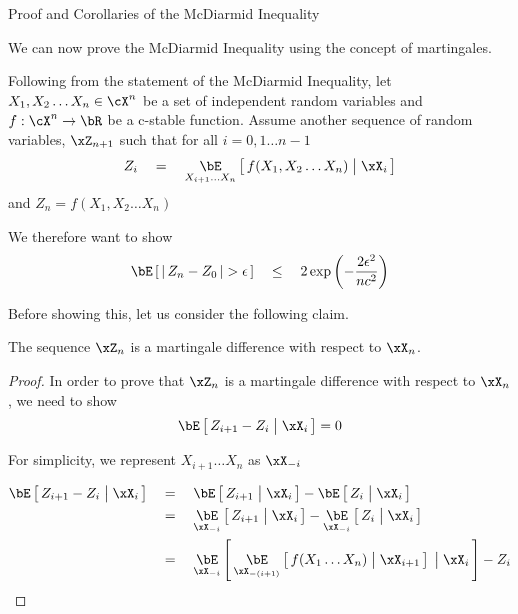 \documentclass{article}
\begin{document}
\begin{ssection}{Proof and Corollaries of the McDiarmid Inequality}
	
	We can now prove the McDiarmid Inequality using the concept of martingales. \br
	
	
	Following from the statement of the McDiarmid Inequality, let $X_1, X_2 \dots X_n \in \cX^n$ be a set of independent random variables and $f : \cX^n \ra \bR$ be a c-stable function. Assume another sequence of random variables, $\xZ_{n + 1}$ such that for all $i = 0, 1 \dots n - 1$
	\begin{align*}
		Z_i	\eq	\E[X_{i + 1} \dots X_n]{f(X_1, X_2 \dots X_n) \pipe \xX_i} 
	\end{align*}
	and $Z_n = f(X_1, X_2 \dots X_n)$
	
	We therefore want to show
	\begin{align*}
		\E{\abs{Z_n - Z_0} > \epsilon}	\qle	2 \texp{- \frac{2 \epsilon^2}{n c^2}} 
	\end{align*}
	
	Before showing this, let us consider the following claim. \br
	
	\begin{claim}
		The sequence $\xZ_n$ is a martingale difference with respect to $\xX_n$.
	\end{claim}
	\begin{proof}
		In order to prove that $\xZ_n$ is a martingale difference with respect to $\xX_n$, we need to show
		\begin{align*}
			\E{Z_{i + 1} - Z_i \pipe \xX_i} = 0 
		\end{align*}
		
		For simplicity, we represent $X_{i + 1} \dots X_n$ as $\xX_{-i}$
		
		\begin{align*}
			\E{Z_{i + 1} - Z_i \pipe \xX_i} & \eq	\E{Z_{i + 1} \pipe \xX_i}	- \E{Z_i \pipe \xX_i}                                        \\
			                                & \eq	\E[\xX_{-i}]{Z_{i + 1} \pipe \xX_i} - \E[\xX_{-i}]{Z_i \pipe \xX_i}                    \\
			                                & \eq	\E[\xX_{-i}]{\E[\xX_{-(i + 1)}]{f(X_1 \dots X_n) \pipe \xX_{i + 1}} \pipe \xX_i} - Z_i 
		\end{align*}
		

\end{proof}
\end{ssection}
\end{document}
